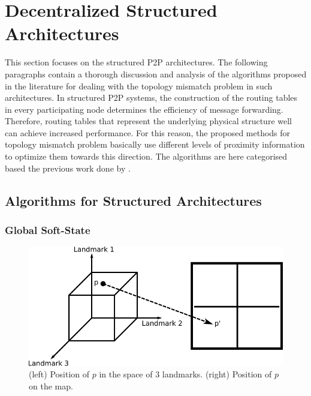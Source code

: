 \section{Decentralized Structured Architectures}
\label{section:structured}

This section focuses on the structured P2P architectures. The following
paragraphs contain a thorough discussion and analysis of the algorithms proposed
in the literature for dealing with the topology mismatch problem in such
architectures. In structured P2P systems, the construction of the routing tables
in every participating node determines the efficiency of message forwarding.
Therefore, routing tables that represent the underlying physical structure well
can achieve increased performance. For this reason, the proposed methods for
topology mismatch problem basically use different levels of proximity
information to optimize them towards this direction. The algorithms are here
categorised based the previous work done by
\cite{castro_proximitydht_2002,castro_topawareroute_2002,ratnasamy_openq_2002}.

\subsection{Algorithms for Structured Architectures}


\subsubsection{Global Soft-State}

\begin{figure}
\centering
  \includegraphics[scale=0.8]{img/algorithms/global_softstate}
\caption{(left) Position of $p$ in the space of $3$ landmarks. (right) Position
of $p$ on the map.}
\label{fig:global_softstate}
\end{figure}

